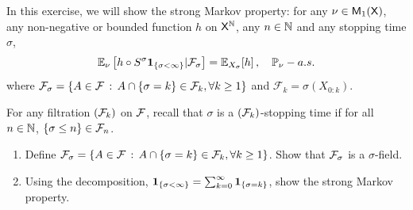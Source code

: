 \documentclass[english,graybox,envcountchap,envcountsame,sectrefs,shortlabels]{svmono}
\theoremstyle{style}
\begin{document}
\begin{exercise}\label{exo:strongMarkov}
In this exercise, we will show the strong Markov property: for any $\nu\in\mathsf{M}_{1}(\mathsf{X})$, any
non-negative or bounded function $h$ on $\mathsf{X}^{\mathbb{N}}$,  any
$n\in\mathbb{N}$ and any stopping time $\sigma$,
\begin{equation*}
\mathbb{E}_{\nu}\left[h\circ S^{\sigma} \mathbf{1}_{\left\{ \sigma <\infty\right\} }|\mathcal{F}_{\sigma}\right]=\mathbb{E}_{X_{\sigma}}[h]\,,\quad\mathbb{P}_{\nu}-a.s.
\end{equation*}
where $\mathcal{F}_\sigma=\left\{ A \in \mathcal{F}\,:\,A\cap \{\sigma =k\} \in \mathcal{F}_k,\forall k\geq 1\right\}$ and $\mathcal{F}_{k}=\sigma(X_{0:k})$.

For any filtration $(\mathcal{F}_k)$ on $\mathcal{F}$, recall that $\sigma$ is a $(\mathcal{F}_k)$-stopping time if for all $n\in\mathbb{N}$, $\{\sigma \leq n\}\in \mathcal{F}_n$.

\begin{enumerate}
\item Define $\mathcal{F}_\sigma=\left\{ A \in \mathcal{F}\,:\,A\cap \{\sigma =k\} \in \mathcal{F}_k,\forall k\geq 1\right\}$. Show that $\mathcal{F}_\sigma$ is a $\sigma$-field.
\item Using the decomposition, $ \mathbf{1}_{\left\{ \sigma <\infty\right\} }=\sum_{k=0}^\infty \mathbf{1}_{\left\{ \sigma=k\right\} }$, show the strong Markov property.
\end{enumerate}

\end{exercise}
\end{document}
